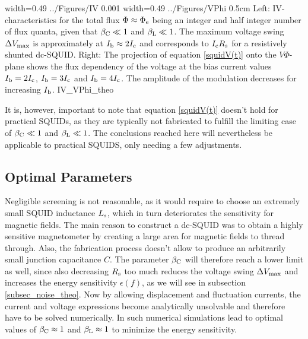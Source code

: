 {width=0.49\textwidth}
{../Figures/IV}
{0.001\textwidth} %
{width=0.49\textwidth}
{../Figures/VPhi}
{0.5cm} %
{Left: IV-characteristics for the total flux $\Phi\approx\Phi_{\rm e}$ being an integer and half integer number of flux quanta, given that $\beta_{\rm C}\ll 1$ and $\beta_{\rm L}\ll 1$. The maximum voltage swing $\Delta V_{\rm max}$ is approximately at $I_{\rm b}\approx 2I_{\rm c}$ and corresponds to $I_{\rm c}R_{\rm s}$ for a resistively shunted dc-SQUID. Right: The projection of equation \ref{squidV(t)} onto the $V\Phi$-plane shows the flux dependency of the voltage at the bias current values $I_{\rm b}=2I_{\rm c}$, $I_{\rm b}=3I_{\rm c}$ and $I_{\rm b}=4I_{\rm c}$. The amplitude of the modulation decreases for increasing $I_{\rm b}$.}
{IV_VPhi_theo}

It is, however, important to note that equation \ref{squidV(t)} doesn't hold for practical SQUIDs, as they are typically not fabricated to fulfill the limiting case of $\beta_{\rm C}\ll 1$ and $\beta_{\rm L}\ll 1$. The conclusions reached here will nevertheless be applicable to practical SQUIDS, only needing a few adjustments. 

\subsection{Optimal Parameters}\label{subsec_optparam_theo}

Negligible screening is not reasonable, as it would require to choose an extremely small SQUID inductance $L_{\rm s}$, which in turn deteriorates the sensitivity for magnetic fields. The main reason to construct a dc-SQUID was to obtain a highly sensitive magnetometer by creating a large area for magnetic fields to thread through. Also, the fabrication process doesn't allow to produce an arbitrarily small junction capacitance $C$. The parameter $\beta_{\rm C}$ will therefore reach a lower limit as well, since also decreasing $R_{\rm s}$ too much reduces the voltage swing $\Delta V_{\rm max}$ and increases the energy sensitivity $\epsilon(f)$, as we will see in subsection \ref{subsec_noise_theo}. Now by allowing displacement and fluctuation currents, the current and voltage expressions become analytically unsolvable and therefore have to be solved numerically. In \cite{Tesche1977} such numerical simulations lead to optimal values of $\beta_{\rm C}\approx 1$ and $\beta_{\rm L}\approx 1$ to minimize the energy sensitivity. \\

